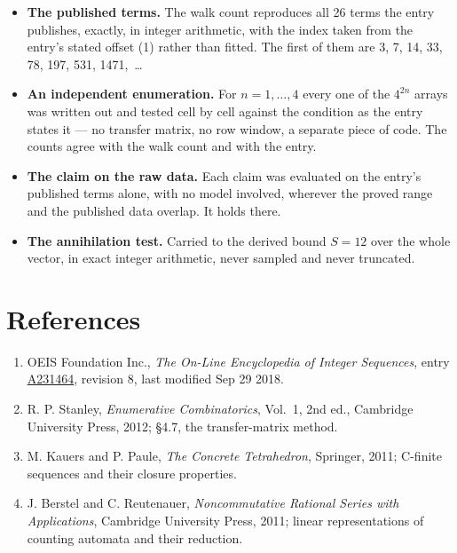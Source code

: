 \documentclass[11pt]{article}
\theoremstyle{definition}
\begin{document}
\begin{itemize}

\item {\bfseries The published terms.} The walk count reproduces all 26 terms the entry publishes, exactly, in integer arithmetic, with the index taken from the entry's stated offset (1) rather than fitted. The first of them are 3, 7, 14, 33, 78, 197, 531, 1471,~\dots

\item {\bfseries An independent enumeration.} For $n = 1,\dots,4$ every one of the $4^{2n}$ arrays was written out and tested cell by cell against the condition as the entry states it --- no transfer matrix, no row window, a separate piece of code. The counts agree with the walk count and with the entry.

\item {\bfseries The claim on the raw data.} Each claim was evaluated on the entry's published terms alone, with no model involved, wherever the proved range and the published data overlap. It holds there.

\item {\bfseries The annihilation test.} Carried to the derived bound $S = 12$ over the whole vector, in exact integer arithmetic, never sampled and never truncated.

\end{itemize}

\section{References}

\begin{enumerate}

\item OEIS Foundation Inc., \emph{The On-Line Encyclopedia of Integer Sequences}, entry \href{https://oeis.org/A231464}{A231464}, revision 8, last modified Sep 29 2018.

\item R. P. Stanley, \emph{Enumerative Combinatorics}, Vol.~1, 2nd ed., Cambridge University Press, 2012; \S4.7, the transfer-matrix method.

\item M. Kauers and P. Paule, \emph{The Concrete Tetrahedron}, Springer, 2011; C-finite sequences and their closure properties.

\item J. Berstel and C. Reutenauer, \emph{Noncommutative Rational Series with Applications}, Cambridge University Press, 2011; linear representations of counting automata and their reduction.

\end{enumerate}
\end{document}
